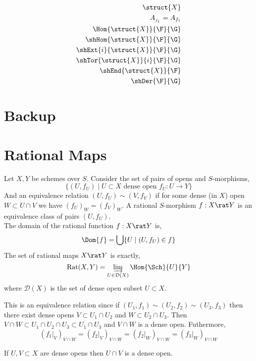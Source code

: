 \documentclass[12pt]{article}
\begin{document}
\begin{align*}
\struct{X}
\\
A_{_{f_1}} = A_{f_1}
\\
\Hom{\struct{X}}{\F}{\G}
\\
\shHom{\struct{X}}{\F}{\G}
\\
\shExt{i}{\struct{X}}{\F}{\G}
\\
\shTor{\struct{X}}{i}{\F}{\G}
\\
\shEnd{\struct{X}}{\F}
\\
\shDer{\F}{\G}
\end{align*}

\section{Backup}

\section{Rational Maps}

\begin{definition}
Let $X, Y$ be schemes over $S$. Consider the set of pairs of opens and $S$-morphisms,
\[ \{ (U, f_U) \mid U \subset X \text{ dense open } f_U : U \to Y \} \]
And an equivalence relation $(U, f_U) \sim (V, f_V)$ if for some dense (in $X$) open $W \subset U \cap V$ we have $(f_U)_{W} = (f_V)_{W}$. A rational $S$-morphism $f : X \rat Y$ is an equivalence class of pairs $(U, f_U)$. 
\bigskip\\
The domain of the rational function $f : X \rat Y$ is,
\[ \Dom{f} = \bigcup \{ U \mid (U, f_U) \in f \} \]
The set of rational maps $X \rat Y$ is exactly,
\[ \mathrm{Rat}(X, Y) = \varinjlim_{U \in \mathcal{D}(X)} \Hom{\Sch}{U}{Y} \]
where $\mathcal{D}(X)$ is the set of dense open subset $U \subset X$.
\end{definition}

\begin{remark}
This is an equivalence relation since if $(U_1, f_1) \sim (U_2, f_2) \sim (U_3, f_3)$ then there exist dense opens $V \subset U_1 \cap U_2$ and $W \subset U_2 \cap U_3$. Then $V \cap W \subset U_1 \cap U_2 \cap U_3 \subset U_1 \cap U_3$ and $V \cap W$ is a dense open. Futhermore,
\[ (f_1|_{V})_{V \cap W} = (f_2|_{V})_{V \cap W} = (f_2|_{W})_{V \cap W} = (f_3|_{W})_{V \cap W} \]
\end{remark}

\begin{lemma}
If $U, V \subset X$ are dense opens then $U \cap V$ is a dense open.
\end{lemma}
\end{document}
